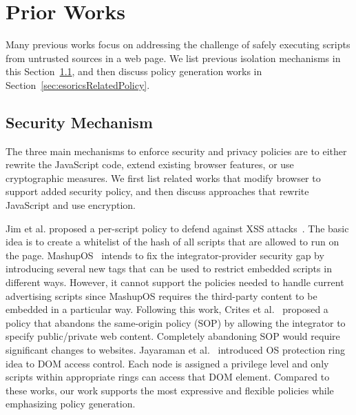 \section{Prior Works}
\label{sec:esorics_related_works}

Many previous works focus on addressing the challenge of safely executing scripts from untrusted sources in a web page.  We list previous isolation mechanisms in this Section~\ref{sec:esoricsRelatedMech}, and then discuss policy generation works in Section~\ref{sec:esoricsRelatedPolicy}.

\subsection{Security Mechanism}\label{sec:esoricsRelatedMech}
The three main mechanisms to enforce security and privacy policies are to either rewrite the JavaScript code, extend existing browser features, or use cryptographic measures.  We first list related works that modify browser to support added security policy, and then discuss approaches that rewrite JavaScript and use encryption.

  Jim et al. proposed a per-script policy to defend against XSS attacks~\cite{Beep}. The basic idea is to create a whitelist of the hash of all scripts that are allowed to run on the page.  MashupOS~\cite{MashupOS} intends to fix the integrator-provider security gap by introducing several new tags that can be used to restrict embedded scripts in different ways.  However, it cannot support the policies needed to handle current advertising scripts since MashupOS requires the third-party content to be embedded in a particular way.  Following this work, Crites et al.~\cite{OMash} proposed a policy that abandons the same-origin policy (SOP) by allowing the integrator to specify public/private web content.  Completely abandoning SOP would require significant changes to websites.  Jayaraman et al.~\cite{escudo} introduced OS protection ring idea to DOM access control.  Each node is assigned a privilege level and only scripts within appropriate rings can access that DOM element.  Compared to these works, our work supports the most expressive and flexible policies while emphasizing policy generation.

\renewcommand{\thefootnote}{$\star$} 

